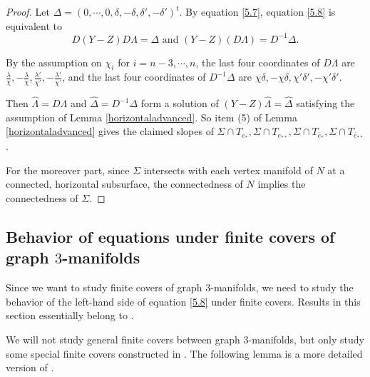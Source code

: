 \documentclass{amsart}
\numberwithin{equation}{section}
\theoremstyle{definition}
\begin{document}
\begin{proof}
Let $\Delta=
(0, \cdots, 0, \delta, -\delta, \delta', -\delta')^t$. By equation \eqref{5.7}, equation \eqref{5.8} is equivalent to 
$$D(Y-Z)D\Lambda=\Delta \text{\ and\ }(Y-Z)(D\Lambda)=D^{-1}\Delta.$$

By the assumption on $\chi_i$ for $i=n-3,\cdots,n$, the last four coordinates of $D\Lambda$ are $\frac{\lambda}{\chi},-\frac{\lambda}{\chi},\frac{\lambda'}{\chi'},-\frac{\lambda'}{\chi'}$, and the last four coordinates of $D^{-1}\Delta$ are $\chi\delta,-\chi\delta,\chi'\delta',-\chi'\delta'$.

Then $\hat{\Lambda}=D\Lambda$ and $\hat{\Delta}=D^{-1}\Delta$ form a solution of $(Y-Z)\hat{\Lambda}=\hat{\Delta}$ satisfying the assumption of Lemma \ref{horizontaladvanced}. So item (5) of Lemma \ref{horizontaladvanced} gives the claimed slopes of $\Sigma\cap T_{e_*},\Sigma\cap T_{e_{**}},\Sigma\cap T_{\bar{e}_*},\Sigma\cap T_{\bar{e}_{**}}$.

For the moreover part, since $\Sigma$ intersects with each vertex manifold of $N$ at a connected, horizontal subsurface, the connectedness of $N$ implies the connectedness of $\Sigma$.
\end{proof}

\subsection{Behavior of equations under finite covers of graph $3$-manifolds}\label{finitecover}

Since we want to study finite covers of graph $3$-manifolds, we need to study the behavior of the left-hand side of equation \eqref{5.8} under finite covers. Results in this section essentially belong to \cite{WY}.

We will not study general finite covers between graph $3$-manifolds, but only study some special finite covers constructed in \cite{WY}. The following lemma is a more detailed version of \cite[Lemma 2.4]{WY}.
\end{document}
